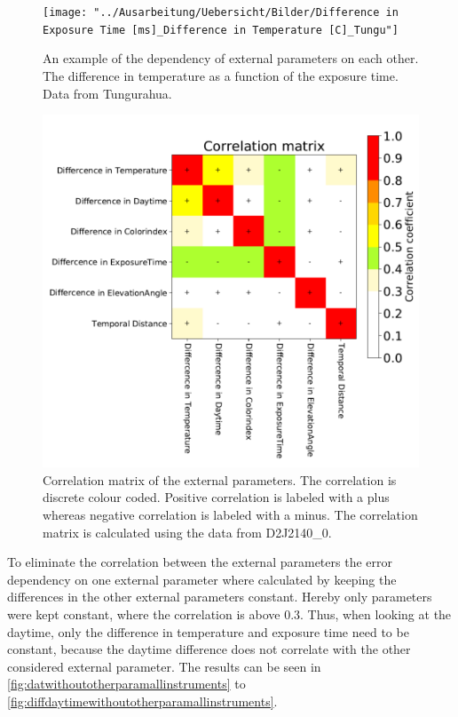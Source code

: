 \documentclass  [
  paper    = a4,
  BCOR     = 10mm,
  twoside,
  fontsize = 12pt,
  fleqn,
  toc      = bibnumbered,
  toc      = listofnumbered,
  numbers  = noendperiod,
  headings = normal,
  listof   = leveldown,
  version  = 3.03
]                                       {scrreprt}
\begin{document}
\begin{figure}[h]
	\centering
	\texttt{[image: "../Ausarbeitung/Uebersicht/Bilder/Difference in Exposure Time [ms]\_Difference in Temperature [C]\_Tungu"]}
	\caption{An example of the dependency of external parameters on each other. The difference in temperature as a function of the exposure time. Data from Tungurahua.}
	\label{fig:difference-in-exposure-time-msdifference-in-temperature-ctungu}
\end{figure}
\begin{figure}[h]
	\centering
	\includegraphics[width=1\linewidth]{Bilder/varCorrelation_matrix}
	\caption[Correlation matrix of the external parameters using the data from D2J2140\_0.]{Correlation matrix of the external parameters. The correlation is discrete colour coded. Positive correlation is labeled with a plus whereas negative correlation is labeled with a minus. The correlation matrix is calculated using the data from D2J2140\_0.}
	\label{fig:varcorrelationmatrix}
\end{figure}
%
To eliminate the correlation between the external parameters the   error dependency on one external parameter where calculated by keeping the differences in the other external parameters constant. Hereby only parameters were kept constant, where the correlation is above 0.3. Thus, when looking at the daytime, only the difference in temperature and exposure time need to be constant, because the daytime difference does not correlate with the other considered external parameter. The results can be seen in \cref{fig:datwithoutotherparamallinstruments} to \cref{fig:diffdaytimewithoutotherparamallinstruments}.\\
\end{document}
